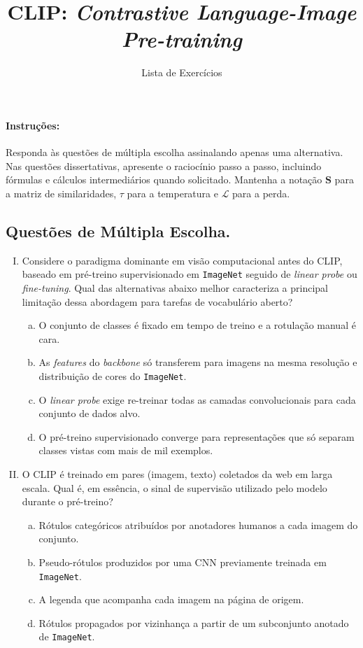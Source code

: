 \documentclass{dlproblemset}
\title{CLIP: \textit{Contrastive Language-Image Pre-training}}
\subtitle{Lista de Exercícios}
\begin{document}
\paragraph{Instruções:} Responda às questões de múltipla escolha assinalando apenas uma alternativa. Nas questões dissertativas, apresente o raciocínio passo a passo, incluindo fórmulas e cálculos intermediários quando solicitado. Mantenha a notação $\mathbf{S}$ para a matriz de similaridades, $\tau$ para a temperatura e $\mathcal{L}$ para a perda.

\subsection*{Questões de Múltipla Escolha.}

\begin{enumerate}[I)]

    \item Considere o paradigma dominante em visão computacional antes do CLIP, baseado em pré-treino supervisionado em \texttt{ImageNet} seguido de \textit{linear probe} ou \textit{fine-tuning}. Qual das alternativas abaixo melhor caracteriza a principal limitação dessa abordagem para tarefas de vocabulário aberto?
    \begin{enumerate}[(a)]
        \item O conjunto de classes é fixado em tempo de treino e a rotulação manual é cara.
        \item As \textit{features} do \textit{backbone} só transferem para imagens na mesma resolução e distribuição de cores do \texttt{ImageNet}.
        \item O \textit{linear probe} exige re-treinar todas as camadas convolucionais para cada conjunto de dados alvo.
        \item O pré-treino supervisionado converge para representações que só separam classes vistas com mais de mil exemplos.
    \end{enumerate}

    \item O CLIP é treinado em pares (imagem, texto) coletados da web em larga escala. Qual é, em essência, o sinal de supervisão utilizado pelo modelo durante o pré-treino?
    \begin{enumerate}[(a)]
        \item Rótulos categóricos atribuídos por anotadores humanos a cada imagem do conjunto.
        \item Pseudo-rótulos produzidos por uma CNN previamente treinada em \texttt{ImageNet}.
        \item A legenda que acompanha cada imagem na página de origem.
        \item Rótulos propagados por vizinhança a partir de um subconjunto anotado de \texttt{ImageNet}.
    \end{enumerate}


\end{enumerate}
\end{document}
